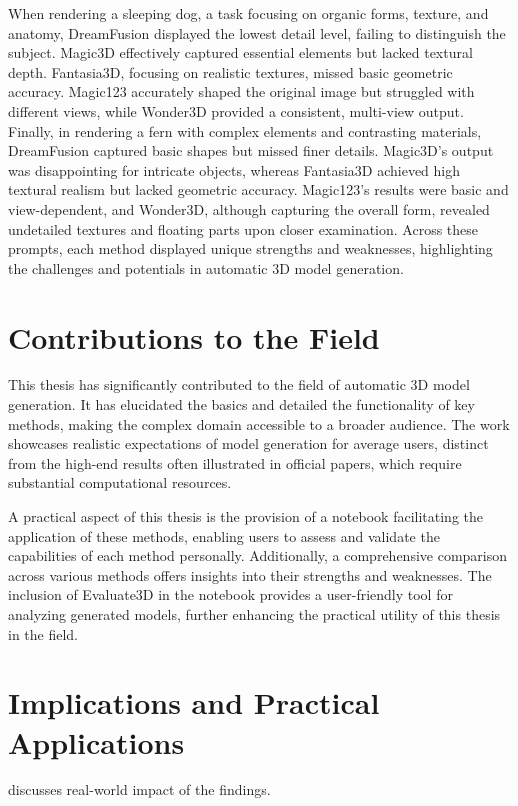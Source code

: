 When rendering a sleeping dog, a task focusing on organic forms, texture, and anatomy, DreamFusion displayed the lowest detail level, failing to distinguish the subject. Magic3D effectively captured essential elements but lacked textural depth. Fantasia3D, focusing on realistic textures, missed basic geometric accuracy. Magic123 accurately shaped the original image but struggled with different views, while Wonder3D provided a consistent, multi-view output. Finally, in rendering a fern with complex elements and contrasting materials, DreamFusion captured basic shapes but missed finer details. Magic3D's output was disappointing for intricate objects, whereas Fantasia3D achieved high textural realism but lacked geometric accuracy. Magic123's results were basic and view-dependent, and Wonder3D, although capturing the overall form, revealed undetailed textures and floating parts upon closer examination. Across these prompts, each method displayed unique strengths and weaknesses, highlighting the challenges and potentials in automatic 3D model generation.

\section{Contributions to the Field}

This thesis has significantly contributed to the field of automatic 3D model generation. It has elucidated the basics and detailed the functionality of key methods, making the complex domain accessible to a broader audience. The work showcases realistic expectations of model generation for average users, distinct from the high-end results often illustrated in official papers, which require substantial computational resources.

A practical aspect of this thesis is the provision of a notebook facilitating the application of these methods, enabling users to assess and validate the capabilities of each method personally. Additionally, a comprehensive comparison across various methods offers insights into their strengths and weaknesses. The inclusion of Evaluate3D in the notebook provides a user-friendly tool for analyzing generated models, further enhancing the practical utility of this thesis in the field.

\section{Implications and Practical Applications}
discusses real-world impact of the findings.